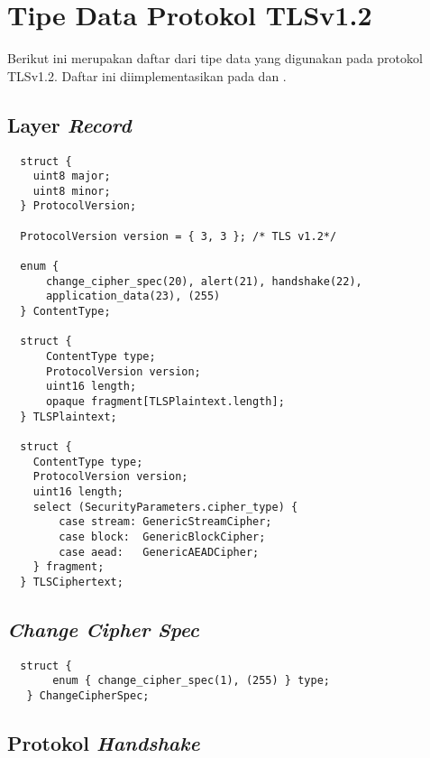 \chapter{{{Tipe Data Protokol TLSv1.2}}} 
\label{appendix:tls12.datatype}

Berikut ini merupakan daftar dari tipe data yang digunakan pada protokol TLSv1.2. Daftar ini diimplementasikan pada \textcite{rfc5246} dan \textcite{rfc4492}.

\section{Layer \emph{Record}}

\begin{verbatim}
  struct {
    uint8 major;
    uint8 minor;
  } ProtocolVersion;

  ProtocolVersion version = { 3, 3 }; /* TLS v1.2*/

  enum {
      change_cipher_spec(20), alert(21), handshake(22),
      application_data(23), (255)
  } ContentType;

  struct {
      ContentType type;
      ProtocolVersion version;
      uint16 length;
      opaque fragment[TLSPlaintext.length];
  } TLSPlaintext;

  struct {
    ContentType type;
    ProtocolVersion version;
    uint16 length;
    select (SecurityParameters.cipher_type) {
        case stream: GenericStreamCipher;
        case block:  GenericBlockCipher;
        case aead:   GenericAEADCipher;
    } fragment;
  } TLSCiphertext;

\end{verbatim}

\section{\emph{Change Cipher Spec}}

\begin{verbatim}
  struct {
       enum { change_cipher_spec(1), (255) } type;
   } ChangeCipherSpec;
\end{verbatim}

\section{Protokol \emph{Handshake}}

